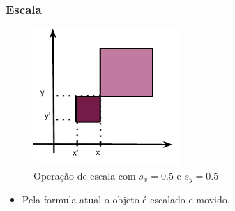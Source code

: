 \documentclass{beamer}
\begin{document}
\begin{frame}
\frametitle{Escala}
	
	\begin{figure}[!h]
		\begin{center}
			\includegraphics[width=0.5\textwidth]{Figures/Escala}
		\end{center}
		\caption{Operação de escala com $s_x = 0.5$ e $s_y = 0.5$}
	\end{figure}
	
	\begin{itemize}
		\item<2-> Pela formula atual o objeto é escalado e movido.
	\end{itemize}
	
\end{frame}
\end{document}
